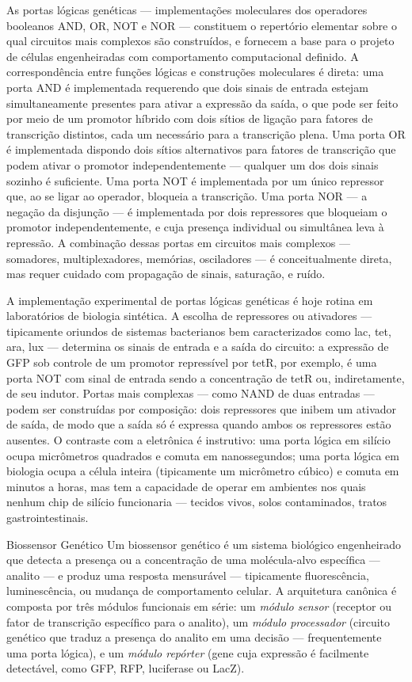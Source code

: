 As portas lógicas genéticas --- implementações moleculares dos operadores booleanos AND, OR, NOT e NOR --- constituem o repertório elementar sobre o qual circuitos mais complexos são construídos, e fornecem a base para o projeto de células engenheiradas com comportamento computacional definido. A correspondência entre funções lógicas e construções moleculares é direta: uma porta AND é implementada requerendo que dois sinais de entrada estejam simultaneamente presentes para ativar a expressão da saída, o que pode ser feito por meio de um promotor híbrido com dois sítios de ligação para fatores de transcrição distintos, cada um necessário para a transcrição plena. Uma porta OR é implementada dispondo dois sítios alternativos para fatores de transcrição que podem ativar o promotor independentemente --- qualquer um dos dois sinais sozinho é suficiente. Uma porta NOT é implementada por um único repressor que, ao se ligar ao operador, bloqueia a transcrição. Uma porta NOR --- a negação da disjunção --- é implementada por dois repressores que bloqueiam o promotor independentemente, e cuja presença individual ou simultânea leva à repressão. A combinação dessas portas em circuitos mais complexos --- somadores, multiplexadores, memórias, osciladores --- é conceitualmente direta, mas requer cuidado com propagação de sinais, saturação, e ruído.

A implementação experimental de portas lógicas genéticas é hoje rotina em laboratórios de biologia sintética. A escolha de repressores ou ativadores --- tipicamente oriundos de sistemas bacterianos bem caracterizados como lac, tet, ara, lux --- determina os sinais de entrada e a saída do circuito: a expressão de GFP sob controle de um promotor repressível por tetR, por exemplo, é uma porta NOT com sinal de entrada sendo a concentração de tetR ou, indiretamente, de seu indutor. Portas mais complexas --- como NAND de duas entradas --- podem ser construídas por composição: dois repressores que inibem um ativador de saída, de modo que a saída só é expressa quando ambos os repressores estão ausentes. O contraste com a eletrônica é instrutivo: uma porta lógica em silício ocupa micrômetros quadrados e comuta em nanossegundos; uma porta lógica em biologia ocupa a célula inteira (tipicamente um micrômetro cúbico) e comuta em minutos a horas, mas tem a capacidade de operar em ambientes nos quais nenhum chip de silício funcionaria --- tecidos vivos, solos contaminados, tratos gastrointestinais.

\begin{definicao}{Biossensor Genético}
Um biossensor genético é um sistema biológico engenheirado que detecta a presença ou a concentração de uma molécula-alvo específica --- analito --- e produz uma resposta mensurável --- tipicamente fluorescência, luminescência, ou mudança de comportamento celular. A arquitetura canônica é composta por três módulos funcionais em série: um \emph{módulo sensor} (receptor ou fator de transcrição específico para o analito), um \emph{módulo processador} (circuito genético que traduz a presença do analito em uma decisão --- frequentemente uma porta lógica), e um \emph{módulo repórter} (gene cuja expressão é facilmente detectável, como GFP, RFP, luciferase ou LacZ).
\end{definicao}

